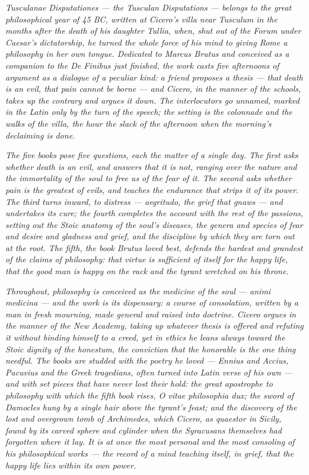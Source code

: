 
\textit{\textit{Tusculanae Disputationes} --- the Tusculan Disputations
--- belongs to the great philosophical year of 45 BC, written at
Cicero's villa near Tusculum in the months after the death of his
daughter Tullia, when, shut out of the Forum under Caesar's
dictatorship, he turned the whole force of his mind to giving Rome a
philosophy in her own tongue. Dedicated to Marcus Brutus and conceived
as a companion to the \textit{De Finibus} just finished, the work casts
five afternoons of argument as a dialogue of a peculiar kind: a friend
proposes a thesis --- that death is an evil, that pain cannot be borne
--- and Cicero, in the manner of the schools, takes up the contrary and
argues it down. The interlocutors go unnamed, marked in the Latin only
by the turn of the speech; the setting is the colonnade and the walks of
the villa, the hour the slack of the afternoon when the morning's
declaiming is done.}

\textit{The five books pose five questions, each the matter of a single
day. The first asks whether death is an evil, and answers that it is
not, ranging over the nature and the immortality of the soul to free us
of the fear of it. The second asks whether pain is the greatest of
evils, and teaches the endurance that strips it of its power. The third
turns inward, to distress --- \textit{aegritudo}, the grief that gnaws
--- and undertakes its cure; the fourth completes the account with the
rest of the passions, setting out the Stoic anatomy of the soul's
diseases, the genera and species of fear and desire and gladness and
grief, and the discipline by which they are torn out at the root. The
fifth, the book Brutus loved best, defends the hardest and grandest of
the claims of philosophy: that virtue is sufficient of itself for the
happy life, that the good man is happy on the rack and the tyrant
wretched on his throne.}

\textit{Throughout, philosophy is conceived as the medicine of the soul
--- \textit{animi medicina} --- and the work is its dispensary: a course
of consolation, written by a man in fresh mourning, made general and
raised into doctrine. Cicero argues in the manner of the New Academy,
taking up whatever thesis is offered and refuting it without binding
himself to a creed, yet in ethics he leans always toward the Stoic
dignity of the \textit{honestum}, the conviction that the honorable is
the one thing needful. The books are studded with the poetry he loved
--- Ennius and Accius, Pacuvius and the Greek tragedians, often turned
into Latin verse of his own --- and with set pieces that have never lost
their hold: the great apostrophe to philosophy with which the fifth book
rises, \textit{O vitae philosophia dux}; the sword of Damocles hung by a
single hair above the tyrant's feast; and the discovery of the lost and
overgrown tomb of Archimedes, which Cicero, as quaestor in Sicily, found
by its carved sphere and cylinder when the Syracusans themselves had
forgotten where it lay. It is at once the most personal and the most
consoling of his philosophical works --- the record of a mind teaching
itself, in grief, that the happy life lies within its own power.}
